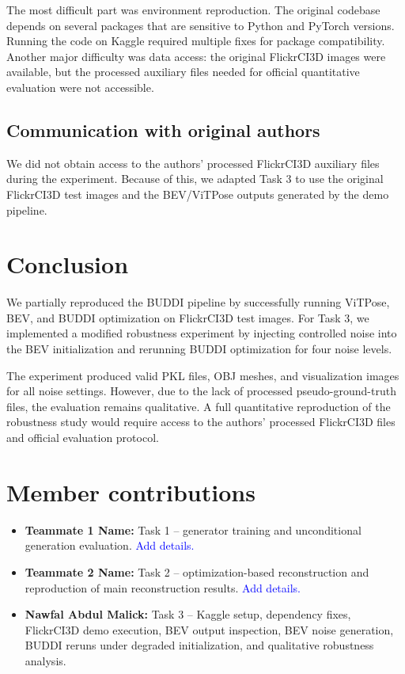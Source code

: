 \documentclass[10pt]{article}
\begin{document}
The most difficult part was environment reproduction. The original codebase depends on several packages that are sensitive to Python and PyTorch versions. Running the code on Kaggle required multiple fixes for package compatibility. Another major difficulty was data access: the original FlickrCI3D images were available, but the processed auxiliary files needed for official quantitative evaluation were not accessible.

\subsection{Communication with original authors}

We did not obtain access to the authors' processed FlickrCI3D auxiliary files during the experiment. Because of this, we adapted Task 3 to use the original FlickrCI3D test images and the BEV/ViTPose outputs generated by the demo pipeline.

\section{Conclusion}

We partially reproduced the BUDDI pipeline by successfully running ViTPose, BEV, and BUDDI optimization on FlickrCI3D test images. For Task 3, we implemented a modified robustness experiment by injecting controlled noise into the BEV initialization and rerunning BUDDI optimization for four noise levels.

The experiment produced valid PKL files, OBJ meshes, and visualization images for all noise settings. However, due to the lack of processed pseudo-ground-truth files, the evaluation remains qualitative. A full quantitative reproduction of the robustness study would require access to the authors' processed FlickrCI3D files and official evaluation protocol.

\section*{Member contributions}

\begin{itemize}
    \item \textbf{Teammate 1 Name:} Task 1 -- generator training and unconditional generation evaluation. \textcolor{blue}{Add details.}
    \item \textbf{Teammate 2 Name:} Task 2 -- optimization-based reconstruction and reproduction of main reconstruction results. \textcolor{blue}{Add details.}
    \item \textbf{Nawfal Abdul Malick:} Task 3 -- Kaggle setup, dependency fixes, FlickrCI3D demo execution, BEV output inspection, BEV noise generation, BUDDI reruns under degraded initialization, and qualitative robustness analysis.
\end{itemize}




% 
\end{document}
